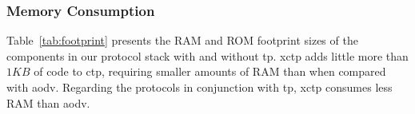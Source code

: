 \subsubsection{Memory Consumption}
\label{sec:memory-consumption}


Table~\ref{tab:footprint} presents the RAM and ROM footprint sizes  of the components in our protocol stack with and without \ac{tp}. \ac{xctp} adds little more than $1KB$ of code to \ac{ctp}, requiring smaller amounts of RAM than when compared with \ac{aodv}. Regarding the protocols in conjunction with \ac{tp}, \ac{xctp} consumes less RAM than \ac{aodv}.

